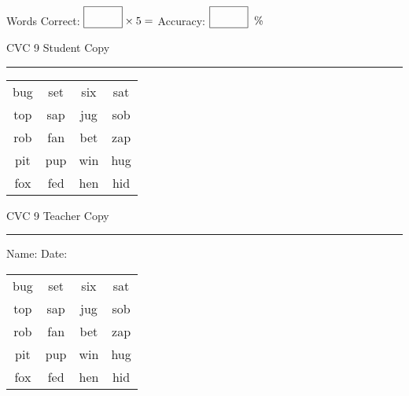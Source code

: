\documentclass{memoir}
\begin{document}
\normalsize

Words Correct: $\fbox{\phantom{\huge 100}} \times 5 = $ Accuracy: $\fbox{\phantom{\huge 100}}\;\; \%$ 

\vfill

\newpage


\footnotesize \noindent
CVC 9 \hfill Student Copy
\smallskip
\hrule

\huge

\setlength{\tabcolsep}{14pt}
\def\arraystretch{2}

{\selectfont


\begin{vplace}[0.5]
\begin{center}
\begin{tabular}{cccc}
bug & set & six & sat \\
top & sap & jug & sob \\
rob & fan & bet & zap \\
pit & pup & win & hug \\
fox & fed & hen & hid \\
\end{tabular}
\end{center}
\end{vplace}

}

\newpage

\footnotesize \noindent
CVC 9 \hfill Teacher Copy
\smallskip
\hrule

\normalsize

\vfill

\noindent
Name: \underline{\hspace{1.75in}} \hfill Date: \underline{\hspace{1in}}

\huge

{\selectfont


\begin{vplace}[0.5]
\begin{center}
\begin{tabular}{cccc}
bug & set & six & sat \\
top & sap & jug & sob \\
rob & fan & bet & zap \\
pit & pup & win & hug \\
fox & fed & hen & hid \\
\end{tabular}
\end{center}
\end{vplace}



}
\end{document}
